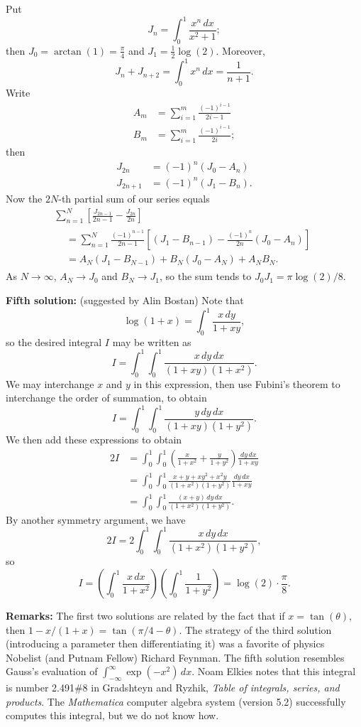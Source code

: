 \documentclass[amssymb,twocolumn,pra,10pt,aps]{revtex4-1}
\begin{document}
\begin{itemize}
Put
\[
J_n = \int_0^1 \frac{x^n\,dx}{x^2+1};
\]
then $J_0 = \arctan(1) = \frac{\pi}{4}$
and $J_1 = \frac{1}{2} \log(2)$. Moreover,
\[
J_{n} + J_{n+2} = \int_0^1 x^n\,dx = \frac{1}{n+1}.
\]
Write
\begin{align*}
A_m &= \sum_{i=1}^m \frac{(-1)^{i-1}}{2i-1} \\
B_m &= \sum_{i=1}^m \frac{(-1)^{i-1}}{2i};
\end{align*}
then
\begin{align*}
J_{2n} &= (-1)^n (J_0 - A_n) \\
J_{2n+1} &= (-1)^n (J_1 - B_{n}).
\end{align*}
Now the $2N$-th partial sum of our series equals
\begin{multline*}
\sum_{n=1}^{N} \left[\frac{J_{2n-1}}{2n-1} -  \frac{J_{2n}}{2n}\right] \\
\begin{aligned}
&= \sum_{n=1}^{N} \frac{(-1)^{n-1}}{2n-1} \left[(J_1 - B_{n-1})
- \frac{(-1)^n}{2n}(J_0 - A_n)\right] \\
&= A_{N}(J_1 - B_{N-1}) + B_N(J_0 - A_N) + A_N B_N.
\end{aligned}
\end{multline*}
As $N \to \infty$, $A_N \to J_0$ and $B_N \to J_1$,
so the sum tends to $J_0 J_1 = \pi \log(2)/8$.

\textbf{Fifth solution:}
(suggested by Alin Bostan)
Note that
\[
\log(1+x) = \int_0^1 \frac{x\,dy}{1 + xy},
\]
so the desired integral $I$ may be written as
\[
I = \int_0^1 \int_0^1 \frac{x\,dy\,dx}{(1 + xy)(1+x^2)}.
\]
We may interchange $x$ and $y$ in this expression, then use Fubini's theorem to interchange
the order of summation, to obtain
\[
I = \int_0^1 \int_0^1 \frac{y\,dy\,dx}{(1 + xy)(1+y^2)}.
\]
We then add these expressions to obtain
\begin{align*}
2I &= \int_0^1 \int_0^1 \left( \frac{x}{1+x^2} + \frac{y}{1+y^2}
\right) \frac{dy\,dx}{1+xy} \\
&= \int_0^1 \int_0^1  \frac{x+y+xy^2+x^2y}{(1+x^2)(1+y^2)} \frac{dy\,dx}{1+xy}  \\
&= \int_0^1 \int_0^1  \frac{(x+y)\,dy\,dx}{(1+x^2)(1+y^2)}.
\end{align*}
By another symmetry argument, we have
\[
2I = 2 \int_0^1 \int_0^1 \frac{x\,dy\,dx}{(1+x^2)(1+y^2)},
\]
so
\[
I = \left(\int_0^1 \frac{x\,dx}{1+x^2} \right) \left( \int_0^1 \frac{1}{1+y^2} \right)
= \log(2) \cdot \frac{\pi}{8}.
\]

\textbf{Remarks:}
The first two solutions are related by the fact that if $x = \tan(\theta)$,
then $1-x/(1+x) = \tan(\pi/4 - \theta)$.
The strategy of the third solution (introducing a parameter then
differentiating it) was a favorite of physics Nobelist (and Putnam Fellow)
Richard Feynman.
The fifth solution resembles Gauss's evaluation of $\int_{-\infty}^\infty \exp(-x^2)\,dx$.
Noam Elkies notes that this integral is number 2.491\#8 in
Gradshteyn and Ryzhik,
\textit{Table of integrals, series, and products}.
The \emph{Mathematica} computer algebra system (version 5.2)
successfully computes
this integral, but we do not know how.


\end{itemize}
\end{document}
